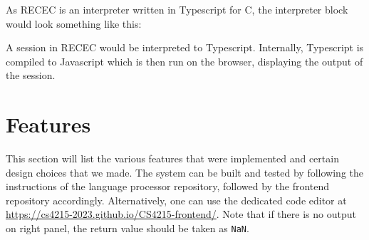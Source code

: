 \documentclass[a4paper]{article}
\begin{document}
As RECEC is an interpreter written in Typescript for C, the interpreter block would look something like this:
\begin{center}
\end{center}

A session in RECEC would be interpreted to Typescript. Internally, Typescript is compiled to Javascript which is then run on the browser, displaying the output of the session.

\begin{center}
\end{center}



\section{Features}
\label{user}


This section will list the various features that were implemented and certain design choices that we made. The system can be built and tested by following the instructions of the language processor repository, followed by the frontend repository accordingly. Alternatively, one can use the dedicated code editor at \url{https://cs4215-2023.github.io/CS4215-frontend/}. Note that if there is no output on right panel, the return value should be taken as \texttt{NaN}.
\end{document}
